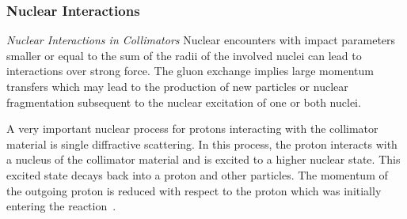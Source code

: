 %


\newpage

\subsubsection{Nuclear Interactions}
\textit{Nuclear Interactions in Collimators} \newline
%
Nuclear encounters with impact parameters smaller or equal to the sum of the radii of the involved nuclei can lead to interactions over strong force. The gluon exchange implies large momentum transfers which may lead to the production of new particles or nuclear fragmentation subsequent to the nuclear excitation of one or both nuclei.

A very important nuclear process for protons interacting with the collimator material is single diffractive scattering. In this process, the proton interacts with a nucleus of the collimator material and is excited to a higher nuclear state. This excited state decays back into a proton and other particles. The momentum of the outgoing proton is reduced with respect to the proton which was initially entering the reaction~\cite{IPAC14:MOPRI077}.


